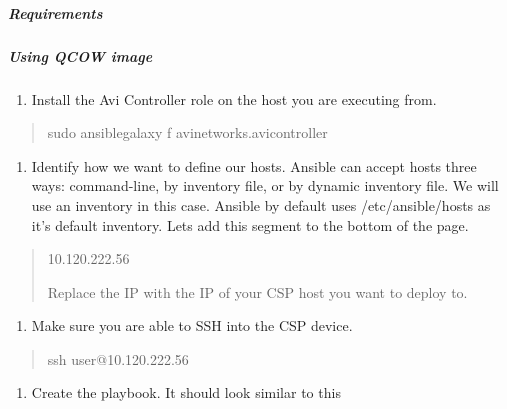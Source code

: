 \documentclass[letterpaper,10pt,english]{sphinxmanual}
\begin{document}
\subparagraph{Requirements}
\label{\detokenize{integrations/ansible/controller:id2}}

\subparagraph{Using QCOW image}
\label{\detokenize{integrations/ansible/controller:using-qcow-image}}
\begin{enumerate}
\item {} 
Install the Avi Controller role on the host you are executing from.

\end{enumerate}
\begin{quote}

\begin{sphinxVerbatim}[commandchars=\\\{\}]
sudo ansible\PYGZhy{}galaxy \PYGZhy{}f avinetworks.avicontroller
\end{sphinxVerbatim}
\end{quote}
\begin{enumerate}
\item {} 
Identify how we want to define our hosts. Ansible can accept hosts three ways: command-line, by inventory file, or by dynamic inventory file. We will use an inventory in this case. Ansible by default uses /etc/ansible/hosts as it's default inventory. Lets add this segment to the bottom of the page.

\end{enumerate}
\begin{quote}

\begin{sphinxVerbatim}
10.120.222.56
\end{sphinxVerbatim}

Replace the IP with the IP of your CSP host you want to deploy to.
\end{quote}
\begin{enumerate}
\item {} 
Make sure you are able to SSH into the CSP device.

\end{enumerate}
\begin{quote}

\begin{sphinxVerbatim}[commandchars=\\\{\}]
ssh user@10.120.222.56
\end{sphinxVerbatim}
\end{quote}
\begin{enumerate}
\item {} 
Create the playbook. It should look similar to this

\end{enumerate}
\end{document}
